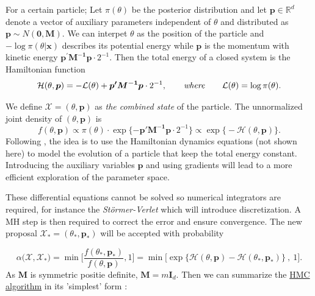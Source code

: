 \begin{definition}
	For a certain particle; Let $\pi(\theta)$ be the posterior distribution and let $\boldsymbol{p}\in\mathbb{R}^d$ denote a vector of auxiliary parameters independent of $\theta$ and distributed as $\boldsymbol{p}\sim N(\boldsymbol{0},\boldsymbol{M})$. We can interpet $\theta$ as the position of the particle and $-\log\pi(\theta|\boldsymbol{x})$ describes its potential energy while $\boldsymbol{p}$ is the momentum with kinetic energy $\boldsymbol{p^{'}M^{-1}p}\cdot2^{-1}$. Then the total energy of a closed system is the Hamiltonian function 
	\begin{equation}
	\mathcal{H}(\theta,\boldsymbol{p})=-\mathcal{L}(\theta)+\boldsymbol{p'M^{-1}p}\cdot 2^{-1}, \qquad\text{\emph{where}}\qquad \mathcal{L}(\theta)=\log\pi(\theta).
	\end{equation}
\end{definition}
We define $\mathcal{X} = (\theta, \boldsymbol{p})$ as \emph{the combined state} of the particle.
The unnormalized joint density of $(\theta,\boldsymbol{p})$ is 
\begin{equation}
f(\theta,\boldsymbol{p})\propto \pi(\theta)\cdot\exp\{-\boldsymbol{p'M^{-1}p}\cdot 2^{-1}\}\propto\exp\big\{-\mathcal{H}(\theta,\boldsymbol{p})\big\}.
\end{equation}
Following \cite{hartmann_bayesian_2016}, the idea is to use the Hamiltonian dynamics equations (not shown here) to model the evolution of a particle that keep the total energy constant.
Introducing the auxiliary variables $\boldsymbol{p}$ and using gradients will lead to a more efficient exploration of the parameter space.

These differential equations cannot be solved so numerical integrators are required, for instance the \emph{Störmer-Verlet} which will introduce discretization. A MH step is then required to correct the error and ensure convergence.  The new proposal $\mathcal{X}_*=(\theta_*,\boldsymbol{p}_*)$ will be accepted with probability 

\begin{equation}
\alpha\big(\mathcal{X},\mathcal{X}_*\big)=\min\Bigg[\frac{f(\theta_*,\boldsymbol{p}_*)}{f(\theta,\boldsymbol{p})},1\Bigg]=\min\Big[\exp\big\{\mathcal{H}(\theta,\boldsymbol{p})-\mathcal{H}(\theta_*,\boldsymbol{p}_*)\big\}\ ,\ 1\Big].
\end{equation}
As $\boldsymbol{M}$ is symmetric positie definite, $\boldsymbol{M}=m\boldsymbol{I}_d$. 
Then we can summarize the \hyperref[algo_hmc]{HMC algorithm} in its 'simplest' form :

